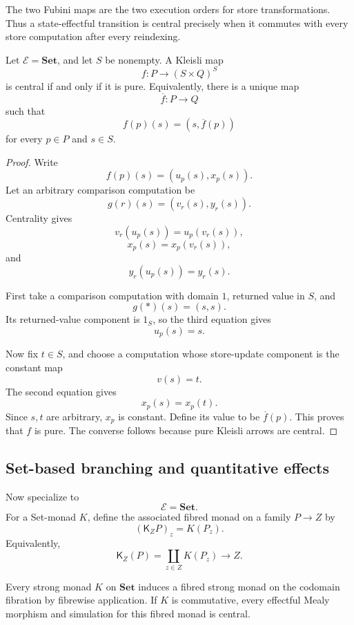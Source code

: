 The two Fubini maps are the two execution orders for store transformations.
Thus a state-effectful transition is central precisely when it commutes with
every store computation after every reindexing.

\begin{proposition}
\label{prop:central-state-computations-set}
Let \(\mathcal E=\mathbf{Set}\), and let \(S\) be nonempty.  A Kleisli map
\[
    f:P\longrightarrow(S\times Q)^S
\]
is central if and only if it is pure.  Equivalently, there is a unique map
\[
    \overline f:P\longrightarrow Q
\]
such that
\[
    f(p)(s)
    =
    (s,\overline f(p))
\]
for every \(p\in P\) and \(s\in S\).
\end{proposition}

\begin{proof}
Write
\[
    f(p)(s)
    =
    (u_p(s),x_p(s)).
\]
Let an arbitrary comparison computation be
\[
    g(r)(s)
    =
    (v_r(s),y_r(s)).
\]
Centrality gives
\[
    v_r(u_p(s))
    =
    u_p(v_r(s)),
\]
\[
    x_p(s)
    =
    x_p(v_r(s)),
\]
and
\[
    y_r(u_p(s))
    =
    y_r(s).
\]

First take a comparison computation with domain \(1\), returned value in
\(S\), and
\[
    g(*)(s)=(s,s).
\]
Its returned-value component is \(1_S\), so the third equation gives
\[
    u_p(s)=s.
\]

Now fix \(t\in S\), and choose a computation whose store-update component is
the constant map
\[
    v(s)=t.
\]
The second equation gives
\[
    x_p(s)=x_p(t).
\]
Since \(s,t\) are arbitrary, \(x_p\) is constant.  Define its value to be
\(\overline f(p)\).  This proves that \(f\) is pure.  The converse follows
because pure Kleisli arrows are central.
\end{proof}

\subsection{Set-based branching and quantitative effects}
\label{subsec:set-based-branching-effects}

Now specialize to
\[
    \mathcal E=\mathbf{Set}.
\]
For a Set-monad \(K\), define the associated fibred monad on a family
\(P\to Z\) by
\[
    (\mathsf K_ZP)_z
    =
    K(P_z).
\]
Equivalently,
\[
    \mathsf K_Z(P)
    =
    \coprod_{z\in Z}K(P_z)
    \longrightarrow
    Z.
\]

\begin{proposition}
\label{prop:fibrewise-set-construction}
Every strong monad \(K\) on \(\mathbf{Set}\) induces a fibred strong monad on
the codomain fibration by fibrewise application.  If \(K\) is commutative,
every effectful Mealy morphism and simulation for this fibred monad is
central.
\end{proposition}

